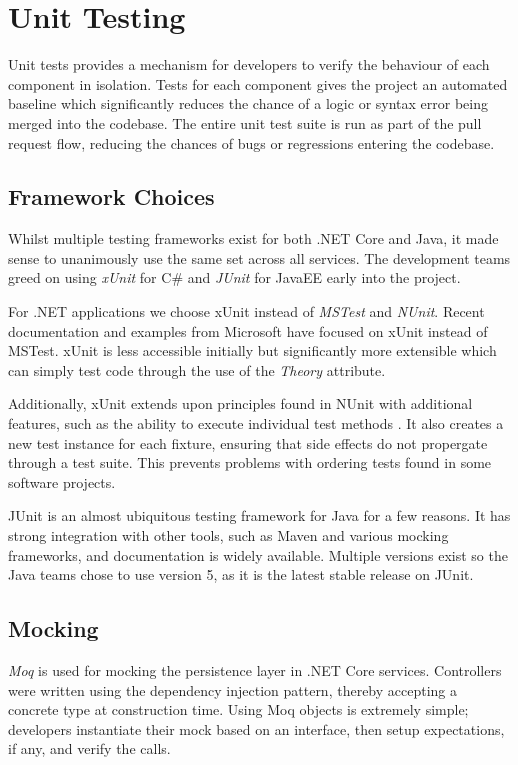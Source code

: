 \section{Unit Testing}
\par
Unit tests provides a mechanism for developers  to verify the behaviour of each component in isolation. Tests for each component gives the project an automated baseline which significantly reduces the chance of a logic or syntax error being merged into the codebase. The entire unit test suite is run as part of the pull request flow, reducing the chances of bugs or regressions entering the codebase.

\par
\subsection{Framework Choices}
Whilst multiple testing frameworks exist for both .NET Core and Java, it made sense to unanimously use the same set across all services. The development teams greed on using \textit{xUnit}\cite{xUnit} for C\# and \textit{JUnit}\cite{JUnit} for JavaEE early into the project.

\par
For .NET applications we choose xUnit instead of \textit{MSTest} and \textit{NUnit}. Recent documentation and examples from Microsoft have focused on xUnit instead of MSTest. xUnit is less accessible initially but significantly more extensible which can simply test code through the use of the \textit{Theory} attribute.

\par
Additionally, xUnit extends upon principles found in NUnit with additional features, such as the ability to execute individual test methods \cite{Nunit_XUnit_comparison}. It also creates a new test instance for each fixture, ensuring that side effects do not propergate through a test suite. This prevents problems with ordering tests found in some software projects.

\par
JUnit is an almost ubiquitous testing framework for Java for a few reasons. It has strong integration with other tools, such as Maven and various mocking frameworks, and documentation is widely available. Multiple versions exist so the Java teams chose to use version 5, as it is the latest stable release on JUnit.

\subsection{Mocking}
\par
\textit{Moq}\cite{Moq} is used for mocking the persistence layer in .NET Core services. Controllers were written using the dependency injection pattern, thereby accepting a concrete type at construction time. Using Moq objects is extremely simple; developers instantiate their mock based on an interface, then setup expectations, if any, and verify the calls.


